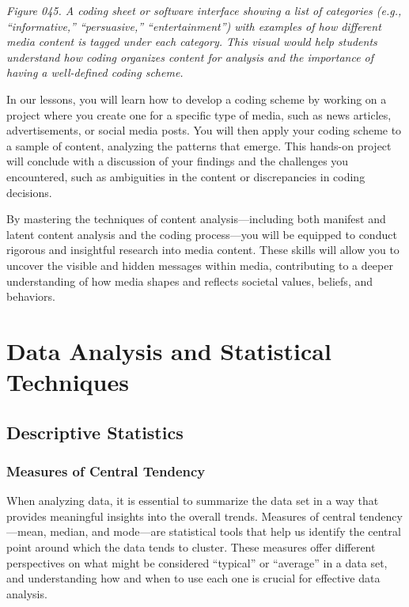 \documentclass[
]{book}
\begin{document}
\emph{Figure 045. A coding sheet or software interface showing a list of categories (e.g., ``informative,'' ``persuasive,'' ``entertainment'') with examples of how different media content is tagged under each category. This visual would help students understand how coding organizes content for analysis and the importance of having a well-defined coding scheme.}

In our lessons, you will learn how to develop a coding scheme by working on a project where you create one for a specific type of media, such as news articles, advertisements, or social media posts. You will then apply your coding scheme to a sample of content, analyzing the patterns that emerge. This hands-on project will conclude with a discussion of your findings and the challenges you encountered, such as ambiguities in the content or discrepancies in coding decisions.

By mastering the techniques of content analysis---including both manifest and latent content analysis and the coding process---you will be equipped to conduct rigorous and insightful research into media content. These skills will allow you to uncover the visible and hidden messages within media, contributing to a deeper understanding of how media shapes and reflects societal values, beliefs, and behaviors.

\chapter{Data Analysis and Statistical Techniques}\label{data-analysis-and-statistical-techniques}

\section{Descriptive Statistics}\label{descriptive-statistics}

\subsection{Measures of Central Tendency}\label{measures-of-central-tendency}

When analyzing data, it is essential to summarize the data set in a way that provides meaningful insights into the overall trends. Measures of central tendency---mean, median, and mode---are statistical tools that help us identify the central point around which the data tends to cluster. These measures offer different perspectives on what might be considered ``typical'' or ``average'' in a data set, and understanding how and when to use each one is crucial for effective data analysis.
\end{document}
